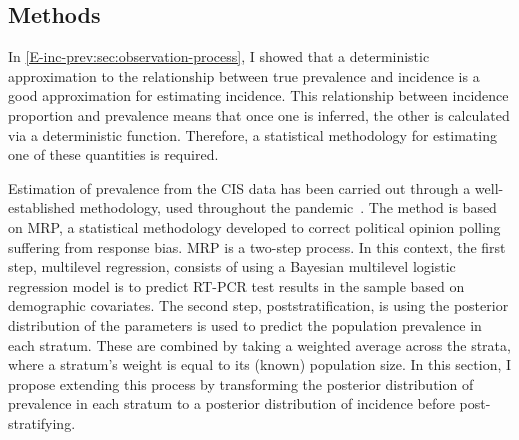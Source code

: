 \documentclass[thesis.tex]{subfiles}
\begin{document}
\subsection{Methods} \label{backcalc:sec:methods}

In \cref{E-inc-prev:sec:observation-process}, I showed that a deterministic approximation to the relationship between true prevalence and incidence is a good approximation for estimating incidence.
This relationship between incidence proportion and prevalence means that once one is inferred, the other is calculated via a deterministic function.
Therefore, a statistical methodology for estimating one of these quantities is required.

Estimation of prevalence from the CIS data has been carried out through a well-established methodology, used throughout the pandemic~\autocite{pouwelsCommunity,cisMethodsONS}.
The method is based on MRP, a statistical methodology developed to correct political opinion polling suffering from response bias.
MRP is a two-step process.
In this context, the first step, multilevel regression, consists of using a Bayesian multilevel logistic regression model is to predict RT-PCR test results in the sample based on demographic covariates.
The second step, poststratification, is using the posterior distribution of the parameters is used to predict the population prevalence in each stratum.
These are combined by taking a weighted average across the strata, where a stratum's weight is equal to its (known) population size.
In this section, I propose extending this process by transforming the posterior distribution of prevalence in each stratum to a posterior distribution of incidence before post-stratifying.
\end{document}
